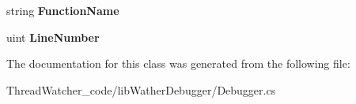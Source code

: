 \begin{DoxyCompactItemize}
\item 
\hypertarget{class_watcher_1_1_debugger_1_1_debugger_ad51abe83cebcc8eb52ab6fd341e975b2}{string {\bfseries Function\+Name}}\label{class_watcher_1_1_debugger_1_1_debugger_ad51abe83cebcc8eb52ab6fd341e975b2}

\item 
\hypertarget{class_watcher_1_1_debugger_1_1_debugger_a31b9d4683e81b0b19c4f33e976de679e}{uint {\bfseries Line\+Number}}\label{class_watcher_1_1_debugger_1_1_debugger_a31b9d4683e81b0b19c4f33e976de679e}

\end{DoxyCompactItemize}


The documentation for this class was generated from the following file\+:\begin{DoxyCompactItemize}
\item 
Thread\+Watcher\+\_\+code/lib\+Wather\+Debugger/Debugger.\+cs\end{DoxyCompactItemize}
